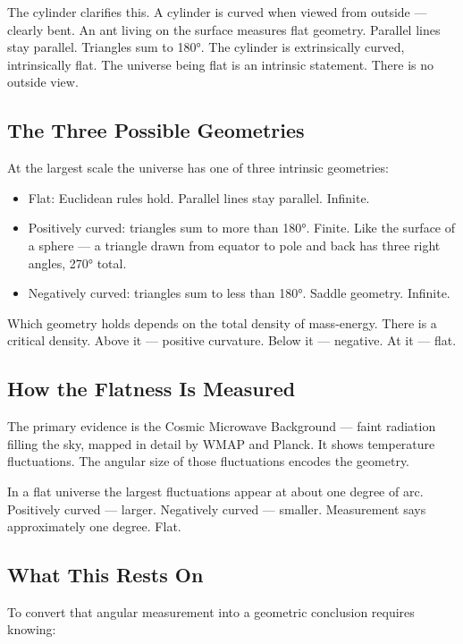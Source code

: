 \documentclass[11pt]{article}
\begin{document}
The cylinder clarifies this. A cylinder is curved when viewed from outside —
clearly bent. An ant living on the surface measures flat geometry. Parallel lines
stay parallel. Triangles sum to 180°. The cylinder is extrinsically curved,
intrinsically flat. The universe being flat is an intrinsic statement. There is
no outside view.

\subsection{The Three Possible Geometries}
\label{sec:org9bacf02}

At the largest scale the universe has one of three intrinsic geometries:

\begin{itemize}
\item Flat: Euclidean rules hold. Parallel lines stay parallel. Infinite.
\item Positively curved: triangles sum to more than 180°. Finite. Like the surface
of a sphere — a triangle drawn from equator to pole and back has three right
angles, 270° total.
\item Negatively curved: triangles sum to less than 180°. Saddle geometry. Infinite.
\end{itemize}

Which geometry holds depends on the total density of mass-energy. There is a
critical density. Above it — positive curvature. Below it — negative. At it —
flat.

\subsection{How the Flatness Is Measured}
\label{sec:orgfdedc65}

The primary evidence is the Cosmic Microwave Background — faint radiation
filling the sky, mapped in detail by WMAP and Planck. It shows temperature
fluctuations. The angular size of those fluctuations encodes the geometry.

In a flat universe the largest fluctuations appear at about one degree of arc.
Positively curved — larger. Negatively curved — smaller. Measurement says
approximately one degree. Flat.

\subsection{What This Rests On}
\label{sec:org95d056b}

To convert that angular measurement into a geometric conclusion requires knowing:
\end{document}
